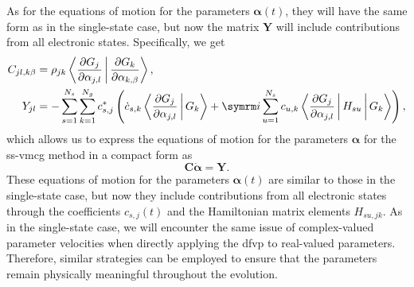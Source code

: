 As for the equations of motion for the parameters $\symbf{\alpha}(t)$, they will have the same form as in the single-state case, but now the matrix $\symbf{Y}$ will include contributions from all electronic states. Specifically, we get
\begin{align}
C_{jl,k\beta}&=\rho_{jk}\Braket{\frac{\partial G_j}{\partial \alpha_{j,l}}|\frac{\vphantom{G_j}\partial G_k}{\partial\alpha_{k,\beta}}},\\
Y_{jl}&=-\sum_{\vphantom{k}s=1}^{\vphantom{N_g}N_s}\sum_{k=1}^{N_g}c_{s,j}^\ast\left(\dot c_{s,k}\Braket{\frac{\partial G_j}{\partial\alpha_{j,l}}|G_k}+\i\sum_{u=1}^{N_s}c_{u,k}\Braket{\frac{\partial G_j}{\partial\alpha_{j,l}}|H_{su}|G_k}\right),
\end{align}
which allows us to express the equations of motion for the parameters $\symbf{\alpha}$ for the \gls{ss-vmcg} method in a compact form as
\begin{equation}\label{eq:ssvmcg_eom_lambda}
\symbf{C}\dot{\symbf{\alpha}}=\symbf{Y}.
\end{equation}
These equations of motion for the parameters $\symbf{\alpha}(t)$ are similar to those in the single-state case, but now they include contributions from all electronic states through the coefficients $c_{s,j}(t)$ and the Hamiltonian matrix elements $H_{su,jk}$. As in the single-state case, we will encounter the same issue of complex-valued parameter velocities when directly applying the \gls{dfvp} to real-valued parameters. Therefore, similar strategies can be employed to ensure that the parameters remain physically meaningful throughout the evolution.
